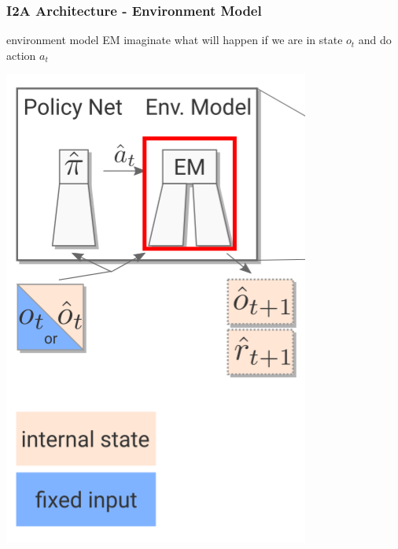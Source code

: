 \begin{frame}
    \frametitle{I2A Architecture - Environment Model}

\begin{multicols}{2}
	\begin{PraesentationAufzaehlung}
		\item environment model EM imaginate what will happen if we are in state $o_t$ and do action $a_t$
	\end{PraesentationAufzaehlung}
    \vfill\columnbreak
	\begin{center}
    \includegraphics[height=0.5\textheight]{./Images/environment_model.png}%
	\end{center}
\end{multicols}
    
\end{frame}
\clearpage

